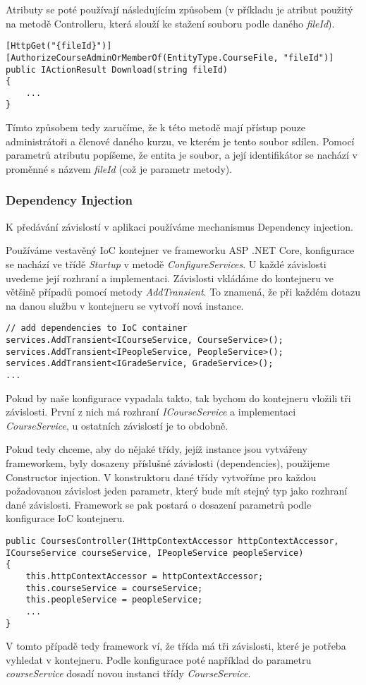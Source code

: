 Atributy se poté používají následujícím způsobem (v příkladu je atribut použitý na metodě Controlleru, která slouží ke stažení souboru podle daného \textit{fileId}).
\begin{lstlisting}
[HttpGet("{fileId}")]
[AuthorizeCourseAdminOrMemberOf(EntityType.CourseFile, "fileId")]
public IActionResult Download(string fileId)
{
	...
}
\end{lstlisting}

Tímto způsobem tedy zaručíme, že k této metodě mají přístup pouze administrátoři a členové daného kurzu, ve kterém je tento soubor sdílen. Pomocí parametrů atributu popíšeme, že entita je soubor, a její identifikátor se nachází v proměnné s názvem \textit{fileId} (což je parametr metody).

\subsubsection*{Dependency Injection}

K předávání závislostí v aplikaci používáme mechanismus Dependency injection. 

Používáme vestavěný IoC kontejner ve frameworku ASP .NET Core, konfigurace se nachází ve třídě \textit{Startup} v metodě \textit{ConfigureServices}.
U každé závislosti uvedeme její rozhraní a implementaci. 
Závislosti vkládáme do kontejneru ve většině případů pomocí metody \textit{AddTransient}. To znamená, že při každém dotazu na danou službu v kontejneru se vytvoří nová instance.
\begin{lstlisting}
// add dependencies to IoC container
services.AddTransient<ICourseService, CourseService>();
services.AddTransient<IPeopleService, PeopleService>();
services.AddTransient<IGradeService, GradeService>();
...
\end{lstlisting}
Pokud by naše konfigurace vypadala takto, tak bychom do kontejneru vložili tři závislosti. První z nich má rozhraní \textit{ICourseService} a implementaci \textit{CourseService}, u ostatních závislostí je to obdobně.

Pokud tedy chceme, aby do nějaké třídy, jejíž instance jsou vytvářeny frameworkem, byly dosazeny příslušné závislosti (dependencies), použijeme Constructor injection. V konstruktoru dané třídy vytvoříme pro každou požadovanou závislost jeden parametr, který bude mít stejný typ jako rozhraní dané závislosti. Framework se pak postará o dosazení parametrů podle konfigurace IoC kontejneru.

\begin{lstlisting}
public CoursesController(IHttpContextAccessor httpContextAccessor, ICourseService courseService, IPeopleService peopleService)
{
	this.httpContextAccessor = httpContextAccessor;
	this.courseService = courseService;
	this.peopleService = peopleService;
	...
}
\end{lstlisting}
V tomto případě tedy framework ví, že třída má tři závislosti, které je potřeba vyhledat v kontejneru.
Podle konfigurace poté například do parametru \textit{courseService} dosadí novou instanci třídy \textit{CourseService}. 

